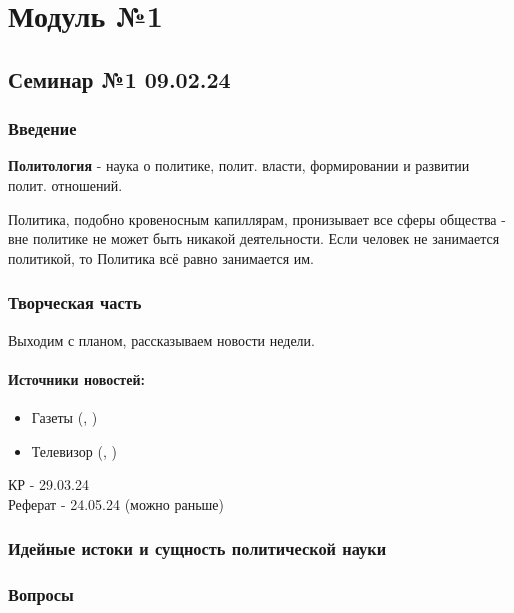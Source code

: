\part{Модуль №1}

\chapter{Семинар №1 09.02.24}

\section{Введение}

\textbf{Политология} - наука о политике, полит. власти, формировании и развитии полит. отношений.

Политика, подобно кровеносным капиллярам, пронизывает все сферы общества - вне политике не может быть никакой деятельности.
Если человек не занимается политикой, то Политика всё равно занимается им.

\section{Творческая часть}

Выходим с планом, рассказываем новости недели.

\subsection*{Источники новостей:}
\begin{itemize}
  \item Газеты (, )
  \item Телевизор (, )
\end{itemize}

КР - 29.03.24 \\
Реферат - 24.05.24 (можно раньше)

\section{Идейные истоки и сущность политической науки}

\section{Вопросы}

